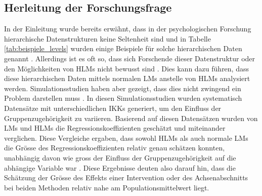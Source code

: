 \documentclass[12pt]{article}\usepackage[]{graphicx}\usepackage[]{color}
\begin{document}
\subsection{Herleitung der Forschungsfrage}
In der Einleitung wurde bereits erwähnt, dass in der psychologischen Forschung hierarchische Datenstrukturen keine Seltenheit sind und in Tabelle \ref{tab:beispiele_levels} wurden einige Beispiele für solche hierarchischen Daten genannt \citep{raudenbush2002hierarchical,SnijdersTomA.B2012Ma:a,woltman2012introduction}. Allerdings ist es oft so, dass sich Forschende dieser Datenstruktur oder den Möglichkeiten von HLMs nicht bewusst sind \citep{mcneish2014analyzing}. Dies kann dazu führen, dass diese hierarchischen Daten mittels normalen LMs anstelle von HLMs analysiert werden. Simulationsstudien haben aber gezeigt, dass dies nicht zwingend ein Problem darstellen muss \citep{mcneish2014analyzing, mundfrom2002monte}. In diesen Simulationsstudien wurden systematisch Datensätze mit unterschiedlichen IKKs generiert, um den Einfluss der Gruppenzugehörigkeit zu variieren. Basierend auf diesen Datensätzen wurden von LMs und HLMs die Regressionskoeffizienten geschätzt und miteinander verglichen. Diese Vergleiche ergaben, dass sowohl HLMs als auch normale LMs die Grösse des Regressionskoeffizienten relativ genau schätzen konnten, unabhängig davon wie gross der Einfluss der Gruppenzugehörigkeit auf die abhängige Variable war  \citep{mcneish2014analyzing, mundfrom2002monte}. Diese Ergebnisse deuten also darauf hin, dass die Schätzung der Grösse des Effekts einer Intervention oder des Achsenabschnitts bei beiden Methoden relativ nahe am Populationsmittelwert liegt.
\end{document}
